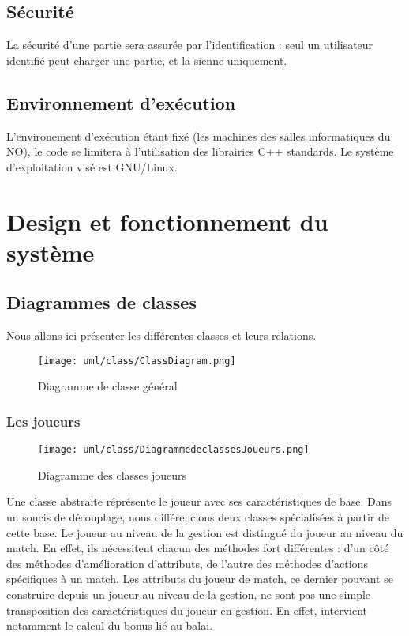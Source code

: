 \documentclass[a4paper,titlepage]{scrreprt}
\begin{document}
  \subsection{Sécurité}
  La sécurité d'une partie sera assurée par l'identification : 
  seul un utilisateur identifié peut charger une partie, et la sienne uniquement.
  \subsection{Environnement d'exécution}
  L'environement d'exécution étant fixé (les machines des salles informatiques du NO), 
  le code se limitera à l'utilisation des librairies C++ standards. 
  Le système d'exploitation visé est GNU/Linux.
\section{Design et fonctionnement du système}
  \subsection{Diagrammes de classes}
  Nous allons ici présenter les différentes classes et leurs relations.
    \begin{figure}[H]
    \center
    \texttt{[image: uml/class/ClassDiagram.png]}
    \caption{Diagramme de classe général}
  \end{figure}	
  \subsubsection{Les joueurs}
    \begin{figure}[H]
    \center
    \texttt{[image: uml/class/DiagrammedeclassesJoueurs.png]}
    \caption{Diagramme des classes joueurs}
  \end{figure}	
    Une classe abstraite réprésente le \gls{joueur} avec ses caractéristiques de base.
    Dans un soucis de découplage, nous différencions deux classes spécialisées à partir de cette base.
    Le joueur au niveau de la gestion est distingué du joueur au niveau du match.
    En effet, ils nécessitent chacun des méthodes fort différentes :
    d'un côté des méthodes d'amélioration d'attributs,
    de l'autre des méthodes d'actions spécifiques à un match.
    Les attributs du joueur de match, ce dernier pouvant se construire depuis un joueur
    au niveau de la gestion, ne sont pas une simple transposition des caractéristiques
    du joueur en gestion. En effet, intervient notamment le calcul du bonus lié au balai.
\end{document}
